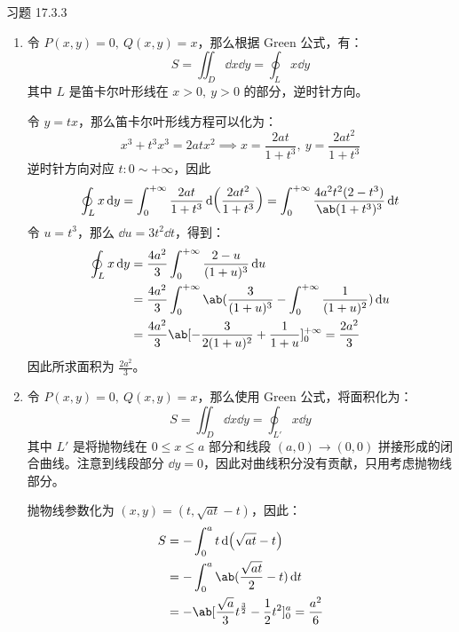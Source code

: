 \begin{problem}
	习题 17.3.3
	\begin{solution}
		\begin{enumerate}
			\item[\textbf{2)}] 令 $P(x, y) = 0,\ Q(x, y) = x$，那么根据 Green 公式，有：
			$$
			S = \iint_D \dd{x} \dd{y} = \oint_L x \dd{y}
			$$
			其中 $L$ 是笛卡尔叶形线在 $x > 0,\ y > 0$ 的部分，逆时针方向。

			令 $y = t x$，那么笛卡尔叶形线方程可以化为：
			$$
			x^3 + t^3 x^3 = 2 a t x^2 \implies x = \frac{2 a t}{1 + t^3},\ y = \frac{2 a t^2}{1 + t^3}
			$$
			逆时针方向对应 $t: 0 \sim +\infty$，因此
			$$
			\oint_L x \dd{y} = \int_{0}^{+\infty} \frac{2 a t}{1 + t^3} \dd(\frac{2 a t^2}{1 + t^3}) = \int_{0}^{+\infty} \frac{4 a^2 t^2 (2 - t^3)}{\ab(1 + t^3)^3} \dd{t}
			$$
			令 $u = t^3$，那么 $\dd{u} = 3 t^2 \dd{t}$，得到：
			$$
			\begin{aligned}
				\oint_L x \dd{y} & = \frac{4 a^2}{3} \int_{0}^{+\infty} \frac{2 - u}{(1 + u)^3} \dd{u} \\
				& = \frac{4 a^2}{3} \int_{0}^{+\infty} \ab(\frac{3}{(1 + u)^3} - \int_{0}^{+\infty} \frac{1}{(1 + u)^2}) \dd{u} \\
				& = \frac{4 a^2}{3} \ab[-\frac{3}{2 (1 + u)^2} + \frac{1}{1 + u}]_{0}^{+\infty} = \frac{2 a^2}{3}
			\end{aligned}
			$$
			因此所求面积为 $\frac{2 a^2}{3}$。

			\item[\textbf{3)}] 令 $P(x, y) = 0,\ Q(x, y) = x$，那么使用 Green 公式，将面积化为：
			$$
			S = \iint_{D} \dd{x} \dd{y} = \oint_{L'} x \dd{y}
			$$
			其中 $L'$ 是将抛物线在 $0 \le x \le a$ 部分和线段 $(a, 0) \to (0, 0)$ 拼接形成的闭合曲线。注意到线段部分 $\dd{y} = 0$，因此对曲线积分没有贡献，只用考虑抛物线部分。
			
			抛物线参数化为 $(x, y) = (t, \sqrt{a t} - t)$，因此：
			$$
			\begin{aligned}
				S & = -\int_{0}^{a} t \dd(\sqrt{a t} - t) \\
				& = -\int_{0}^{a} \ab(\frac{\sqrt{a t}}{2} - t) \dd{t} \\
				& = -\ab[\frac{\sqrt{a}}{3} t^{\frac{3}{2}} - \frac{1}{2} t^2]_{0}^{a} = \frac{a^2}{6}
			\end{aligned}
			$$
		\end{enumerate}
	\end{solution}
\end{problem}

